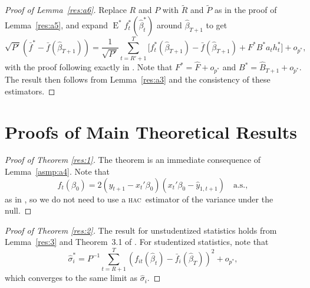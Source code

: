 \documentclass[12pt]{article}
\theoremstyle{definition}
\DeclareMathOperator{\E}{E}
\newcommand{\hac}{\textsc{hac}}
\begin{document}
\begin{proof}[Proof of Lemma~\ref{res:a6}]
  Replace $R$ and $P$ with $\tilde{R}$ and $\tilde{P}$ as in the proof
  of Lemma~\ref{res:a5}, and expand $\E^{*}
  f_t^{*}(\hat{\beta}_t^{*})$ around $\hat{\beta}_{T+1}$ to get
  \begin{equation}
    \sqrt{P'} (\bar{f}^{*} - \bar{f}(\hat{\beta}_{T+1})) =
    \frac{1}{\sqrt{P'}} \sum_{t=R'+1}^T
    \big[f_t^{*}(\hat{\beta}_{T+1}) - \bar{f}(\hat{\beta}_{T+1}) +
    F^{*} B^{*} a_t h_t^{*} \big] + o_{p^{*}},
  \end{equation}
  with the proof following exactly in \citet[Theorem 2.3.1]{Mcc:00}.
  Note that $F^{*} = \hat{F} + o_{p^{*}}$ and $B^{*} = \hat{B}_{T+1} +
  o_{p^{*}}$.  The result then follows from Lemma~\ref{res:a3} and the
  consistency of these estimators.
\end{proof}

\section{Proofs of Main Theoretical Results}

\begin{proof}[Proof of Theorem \ref{res:1}]
  The theorem is an immediate consequence of Lemma~\ref{asmp:a4}.
  Note that \[f_t(\beta_0)= 2 (y_{t+1} - x_t'\beta_0)(x_t'\beta_0 -
  \hat{y}_{1,t+1}) \quad \text{a.s.},\] as in \citet{ClW:07}, so we do
  not need to use a \hac\ estimator of the variance under the null.
\end{proof}

\begin{proof}[Proof of Theorem \ref{res:2}]
  The result for unstudentized statistics holds from Lemma~\ref{res:3}
  and Theorem~3.1 of \citet{RoW:05}.  For studentized statistics, note
  that
  \begin{equation}
    \hat{\sigma}_i^{*} = P^{-1} \sum_{t=R+1}^T (f_{it}(\hat{\beta}_t)
    - \bar{f}_i(\hat{\beta}_T))^2 + o_{p^{*}},
  \end{equation}
  which converges to the same limit as $\hat{\sigma}_i$.
\end{proof}


\end{document}

